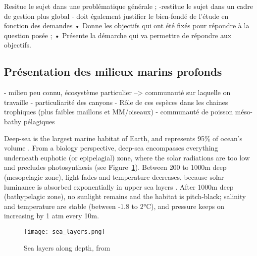

Resitue le sujet dans une problématique générale ;
 -restitue le sujet dans un cadre de gestion plus global
- doit également justifier le bien-fondé de l’étude en fonction des demandes
• Donne les objectifs qui ont été fixés pour répondre à la question posée ;
• Présente la démarche qui va permettre de répondre aux objectifs.


\subsection{Présentation des milieux marins profonds}
- milieu peu connu, écosystème particulier --> communauté sur laquelle on travaille 
- particuliarité des canyons 
- Rôle de ces espèces dans les chaines trophiques (plus faibles maillons et MM/oiseaux)
- communauté de poisson méso-bathy pélagiques 


Deep-sea is the largest marine habitat of Earth, and represents 95\% of ocean's volume \citep{danovaro2017,salazar2016}. From a biology perspective, deep-sea encompasses everything underneath euphotic (or epipelagial) zone, where the solar radiations are too low and precludes photosynthesis \citep{baker2020,danovaro2017,salazar2016} (see Figure~\ref{fig:dsl}). Between 200 to 1000m deep (mesopelagic zone), light fades and temperature decreases, because solar luminance is absorbed exponentially in upper sea layers \citep{reynolds2001}. After 1000m deep (bathypelagic zone), no sunlight remains and the habitat is pitch-black; salinity and temperature are stable (between -1.8 to 2°C), and pressure keeps on increasing by 1 atm every 10m. 

\begin{figure} [!htbp]
	\begin{center}
		\texttt{[image: sea\_layers.png]}
	\end{center}
	\caption[Petite légende]{Sea layers along depth, from \citep{fig_deep_sea}}
	\label{fig:dsl}
\end{figure}

